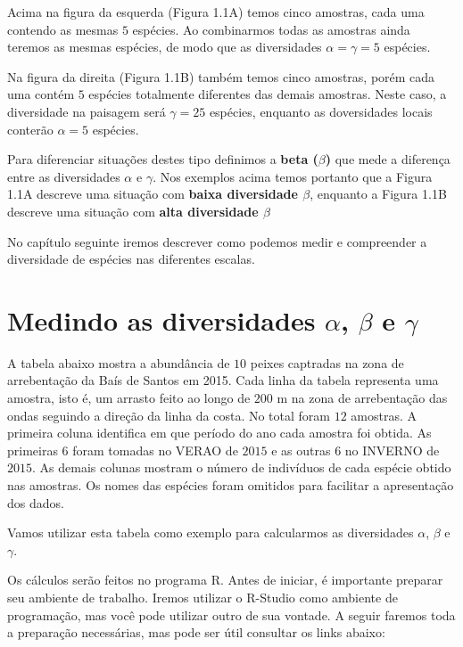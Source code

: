 \documentclass[
]{book}
\begin{document}
Acima na figura da esquerda (Figura 1.1A) temos cinco amostras, cada uma contendo as mesmas \(5\) espécies. Ao combinarmos todas as amostras ainda teremos as mesmas espécies, de modo que as diversidades \(\alpha = \gamma = 5\) espécies.

Na figura da direita (Figura 1.1B) também temos cinco amostras, porém cada uma contém \(5\) espécies totalmente diferentes das demais amostras. Neste caso, a diversidade na paisagem será \(\gamma = 25\) espécies, enquanto as doversidades locais conterão \(\alpha = 5\) espécies.

Para diferenciar situações destes tipo definimos a \textbf{beta (\(\beta\))} que mede a diferença entre as diversidades \(\alpha\) e \(\gamma\). Nos exemplos acima temos portanto que a Figura 1.1A descreve uma situação com \textbf{baixa diversidade \(\beta\)}, enquanto a Figura 1.1B descreve uma situação com \textbf{alta diversidade \(\beta\)}

No capítulo seguinte iremos descrever como podemos medir e compreender a diversidade de espécies nas diferentes escalas.

\hypertarget{diversidader}{%
\chapter{\texorpdfstring{Medindo as diversidades \(\alpha\), \(\beta\) e \(\gamma\)}{Medindo as diversidades \textbackslash alpha, \textbackslash beta e \textbackslash gamma}}\label{diversidader}}

A tabela abaixo mostra a abundância de \(10\) peixes captradas na zona de arrebentação da Baís de Santos em 2015. Cada linha da tabela representa uma amostra, isto é, um arrasto feito ao longo de \(200\) m na zona de arrebentação das ondas seguindo a direção da linha da costa. No total foram \(12\) amostras. A primeira coluna identifica em que período do ano cada amostra foi obtida. As primeiras 6 foram tomadas no VERAO de \(2015\) e as outras 6 no INVERNO de \(2015\). As demais colunas mostram o número de indivíduos de cada espécie obtido nas amostras. Os nomes das espécies foram omitidos para facilitar a apresentação dos dados.

Vamos utilizar esta tabela como exemplo para calcularmos as diversidades \(\alpha\), \(\beta\) e \(\gamma\).

Os cálculos serão feitos no programa R. Antes de iniciar, é importante preparar seu ambiente de trabalho. Iremos utilizar o R-Studio como ambiente de programação, mas você pode utilizar outro de sua vontade. A seguir faremos toda a preparação necessárias, mas pode ser útil consultar os links abaixo:
\end{document}
